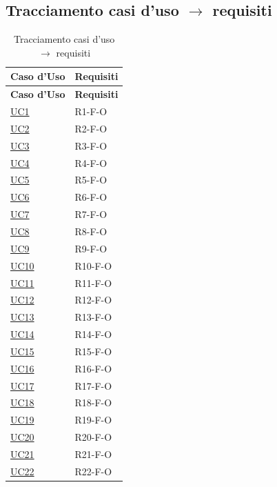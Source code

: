 \subsection{Tracciamento casi d'uso $\rightarrow$ requisiti}
\begin{longtable}{|p{2.8cm}|p{10.2cm}|}
	\caption{Tracciamento casi d'uso $\rightarrow$ requisiti} \\
	\hline
	\rowcolor{primarycolor!10}
	\textbf{Caso d'Uso} & \textbf{Requisiti} \\
	\hline
	\endfirsthead
	\hline
	\rowcolor{primarycolor!10}
	\textbf{Caso d'Uso} & \textbf{Requisiti} \\
	\hline
	\endhead

	\hyperlink{uc1}{UC1}     & R1-F-O \\ \hline
	\hyperlink{uc2}{UC2}     & R2-F-O \\ \hline
	\hyperlink{uc3}{UC3}     & R3-F-O \\ \hline
	\hyperlink{uc4}{UC4}     & R4-F-O \\ \hline
	\hyperlink{uc5}{UC5}     & R5-F-O \\ \hline
	\hyperlink{uc6}{UC6}     & R6-F-O \\ \hline
	\hyperlink{uc7}{UC7}     & R7-F-O \\ \hline
	\hyperlink{uc8}{UC8}     & R8-F-O \\ \hline
	\hyperlink{uc9}{UC9}     & R9-F-O \\ \hline
	\hyperlink{uc10}{UC10}   & R10-F-O \\ \hline
	\hyperlink{uc11}{UC11}   & R11-F-O \\ \hline
	\hyperlink{uc12}{UC12}   & R12-F-O \\ \hline
	\hyperlink{uc13}{UC13}   & R13-F-O \\ \hline
	\hyperlink{uc14}{UC14}   & R14-F-O \\ \hline
	\hyperlink{uc15}{UC15}   & R15-F-O \\ \hline
	\hyperlink{uc16}{UC16}   & R16-F-O \\ \hline
	\hyperlink{uc17}{UC17}   & R17-F-O \\ \hline
	\hyperlink{uc18}{UC18}   & R18-F-O \\ \hline
	\hyperlink{uc19}{UC19}   & R19-F-O \\ \hline
	\hyperlink{uc20}{UC20}   & R20-F-O \\ \hline
	\hyperlink{uc21}{UC21}   & R21-F-O \\ \hline
	\hyperlink{uc22}{UC22}   & R22-F-O \\ \hline

\end{longtable}
